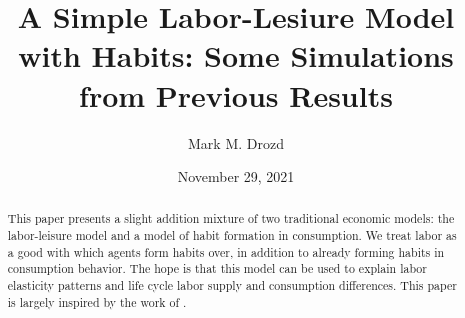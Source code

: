 \documentclass[ProjectMMD]{subfiles}
\begin{document}
\providecommand{\versn}{pdf} %
\ifthenelse{\boolean{Web}}{    %
  \renewcommand{\versn}{Web}     %
  \renewcommand{\rootFromOut}{.} %
}{}  %


\title{A Simple Labor-Lesiure Model with Habits: Some Simulations from Previous Results }

\author{Mark M. Drozd \authNum}


\renewcommand{\forcedate}{November 29, 2021}\date{\forcedate}

\maketitle
\hypertarget{abstract}{}
\begin{abstract}
  This paper presents a slight addition mixture of two traditional economic models: the labor-leisure model and a model of habit formation in consumption. We treat labor as a good with which agents form habits over, in addition to already forming habits in consumption behavior. The hope is that this model can be used to explain labor elasticity patterns and life cycle labor supply and consumption differences. This paper is largely inspired by the work of \cite{bover1991relaxing}.
\end{abstract}


\hypertarget{links}{}
\end{document}
